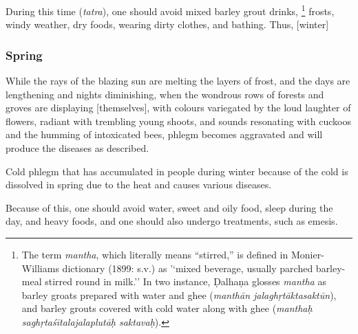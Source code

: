 \begin{translation}
	\item[35] %
	During this time (\emph{tatra}), one should avoid mixed barley grout drinks,%
	\footnote{The term \emph{mantha}, which literally means ``stirred,'' is defined in Monier-Williams dictionary (1899: s.v.) as '`mixed beverage, usually parched barley-meal stirred round in milk.'' In two instance, Ḍalhaṇa \citep[811 and 779]{vulgate} glosses \emph{mantha} as barley groats prepared with water and ghee (\emph{manthān jalaghṛtāktasaktūn}), and barley grouts covered with cold water along with ghee (\emph{manthaḥ saghṛtaśītalajalaplutāḥ saktavaḥ}).} %
	frosts, windy weather, dry foods, wearing dirty clothes, and bathing. %
	Thus, [winter]

	\subsubsection{Spring}%

	\item[36--48] %
	While the rays of the blazing sun %
	are melting %
	the layers of frost, %
	and the days are lengthening and nights diminishing, %
	when the wondrous  %
	rows of forests and groves %
	are displaying [themselves], %
	with colours variegated %
	by the loud laughter of flowers, %
	radiant with trembling young shoots, %
	and sounds %
	resonating with cuckoos %
	and the humming of intoxicated bees, %
	phlegm becomes aggravated %
	and will produce %
	the diseases as described. %

	\item[39] %
	Cold phlegm that has accumulated in people during winter because of the cold is dissolved %
	in spring due to the heat and causes various diseases.

	\item[40]
	Because of this, one should avoid water, sweet and oily food, sleep during the day, and heavy foods, and one should also undergo treatments, such as emesis.


\end{translation}
